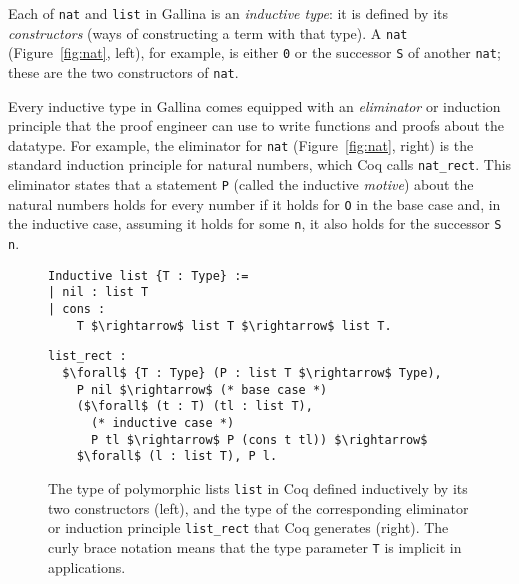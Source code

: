 Each of \lstinline{nat} and \lstinline{list} in Gallina is an \textit{inductive type}:
it is defined by its \textit{constructors} (ways of constructing a term with that type).
A \lstinline{nat} (Figure~\ref{fig:nat}, left), for example,
is either \lstinline{0} or the successor \lstinline{S} of another \lstinline{nat};
these are the two constructors of \lstinline{nat}.

Every inductive type in Gallina comes equipped with an \textit{eliminator} or induction principle
that the proof engineer can use to write functions and proofs about the datatype.
For example, the eliminator for \lstinline{nat} (Figure~\ref{fig:nat}, right) is the standard induction principle for natural numbers,
which Coq calls \lstinline{nat_rect}. %
This eliminator states that a statement \lstinline{P} (called the inductive \textit{motive}) about the natural numbers
holds for every number if it holds for \lstinline{O} in the base case and, in the inductive case,
assuming it holds for some \lstinline{n}, it also holds for the successor \lstinline{S n}.

\begin{figure}
\begin{minipage}{0.44\textwidth}
\begin{lstlisting}
Inductive list {T : Type} :=
| nil : list T
| cons :
    T $\rightarrow$ list T $\rightarrow$ list T.
\end{lstlisting}
\end{minipage}
\hfill
\begin{minipage}{0.54\textwidth}
\begin{lstlisting}
list_rect :
  $\forall$ {T : Type} (P : list T $\rightarrow$ Type),
    P nil $\rightarrow$ (* base case *)
    ($\forall$ (t : T) (tl : list T),
      (* inductive case *)
      P tl $\rightarrow$ P (cons t tl)) $\rightarrow$
    $\forall$ (l : list T), P l.
\end{lstlisting}
\end{minipage}
\caption{The type of polymorphic lists \lstinline{list} in Coq defined inductively by its two constructors (left), and the type of the corresponding eliminator or induction principle \lstinline{list_rect} that Coq generates (right). The curly brace notation means that the type parameter \lstinline{T} is implicit in applications.}
\label{fig:list}
\end{figure}


